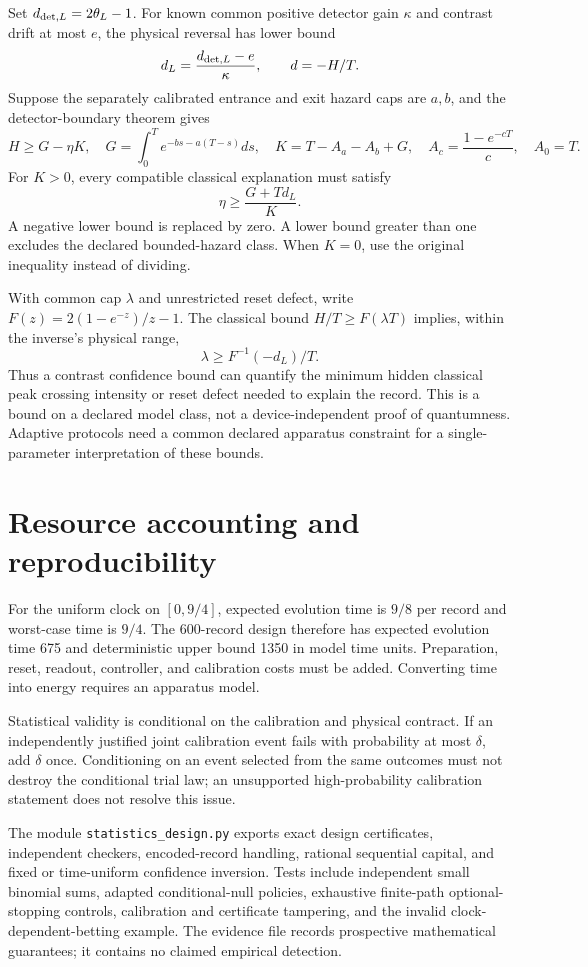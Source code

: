 Set $d_{{\rm det},L}=2\theta_L-1$. For known common positive detector
gain $\kappa$ and contrast drift at most $e$, the physical reversal has
lower bound
\[
 d_L=\frac{d_{{\rm det},L}-e}{\kappa},\qquad d=-H/T.
\]
Suppose the separately calibrated entrance and exit hazard caps are $a,b$,
and the detector-boundary theorem gives
\[
 H\geq G-\eta K,\quad
 G=\int_0^T e^{-bs-a(T-s)}ds,\quad
 K=T-A_a-A_b+G,\quad
 A_c=\frac{1-e^{-cT}}c,\quad A_0=T.
\]
For $K>0$, every compatible classical explanation must satisfy
\begin{equation}\label{rr:defect-confidence}
 \eta\geq\frac{G+Td_L}{K}.
\end{equation}
A negative lower bound is replaced by zero. A lower bound greater than
one excludes the declared bounded-hazard class. When $K=0$, use the
original inequality instead of dividing.

With common cap $\lambda$ and unrestricted reset defect, write
$F(z)=2(1-e^{-z})/z-1$. The classical bound $H/T\geq F(\lambda T)$
implies, within the inverse's physical range,
\[
 \lambda\geq F^{-1}(-d_L)/T.
\]
Thus a contrast confidence bound can quantify the minimum hidden classical
peak crossing intensity or reset defect needed to explain the record. This is a bound on
a declared model class, not a device-independent proof of quantumness.
Adaptive protocols need a common declared apparatus constraint for a
single-parameter interpretation of these bounds.

\section{Resource accounting and reproducibility}
For the uniform clock on $[0,9/4]$, expected evolution time is $9/8$ per
record and worst-case time is $9/4$. The 600-record design therefore has
expected evolution time 675 and deterministic upper bound 1350 in model
time units. Preparation, reset, readout, controller, and calibration costs
must be added. Converting time into energy requires an apparatus model.

Statistical validity is conditional on the calibration and physical
contract. If an independently justified joint calibration event fails
with probability at most $\delta$, add $\delta$ once. Conditioning on an
event selected from the same outcomes must not destroy the conditional
trial law; an unsupported high-probability calibration statement does
not resolve this issue.

The module \texttt{statistics\_design.py} exports exact design certificates,
independent checkers, encoded-record handling, rational sequential capital,
and fixed or time-uniform confidence inversion. Tests include independent
small binomial sums, adapted conditional-null policies, exhaustive
finite-path optional-stopping controls, calibration and certificate
tampering, and the invalid clock-dependent-betting example. The evidence
file records prospective mathematical guarantees; it contains no claimed
empirical detection.

